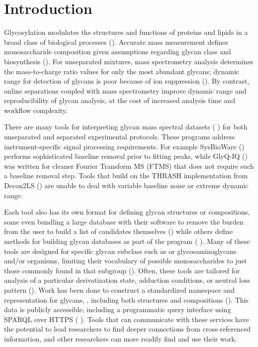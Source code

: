 \section{Introduction}

Glycosylation modulates the structures and functions of proteins and lipids
in a broad class of biological processes (\cite{Varki2017}). Accurate mass
measurement defines monosaccharide composition given assumptions regarding
glycan class and biosynthesis (\cite{Zaia2008}). For unseparated mixtures,
mass spectrometry analysis determines the mass-to-charge ratio values for
only the most abundant glycans; dynamic range for detection of glycans is
poor because of ion suppression (\cite{Peltoniemi2013}). By contrast, online
separations coupled with mass spectrometry improve dynamic range and
reproducibility of glycan analysis, at the cost of increased analysis time
and workflow complexity.

There are many tools for interpreting glycan mass spectral datasets (
\cite{Yu2013,Peltoniemi2013,Kronewitter2014,Goldberg2009,Maxwell2012,Ceroni2008,Frank2010})
for both unseparated and separated experimental protocols. These programs address
instrument-specific signal processing requirements. For example SysBioWare
(\cite{Frank2010}) performs sophisticated baseline removal prior to fitting
peaks, while GlyQ-IQ (\cite{Kronewitter2014}) was written for cleaner Fourier Transform
MS (FTMS) that does not require such a baseline removal step. Tools that build on
the THRASH implementation from Decon2LS (\cite{Jaitly2009,Yu2013,Maxwell2012})
are unable to deal with variable baseline noise or extreme dynamic range.

Each tool also has its own format for defining glycan structures or compositions,
some even bundling a large database with their software to remove the burden from
the user to build a list of candidates themselves (\cite{Yu2013,Kronewitter2014,Goldberg2009})
while others define methods for building glycan databases as part of the program (
\cite{Maxwell2012,Ceroni2008}). Many of these tools are designed for specific glycan
subclass such as \nglycans or glycosaminoglycans and/or organisms, limiting their
vocabulary of possible monosaccharides to just those commonly found in that subgroup
(\cite{Yu2013,Kronewitter2014,Peltoniemi2013,Goldberg2009}). Often, these tools are
tailored for analysis of a particular derivatization state, adduction conditions, or
neutral loss pattern (\cite{Yu2013,Peltoniemi2013,Maxwell2012}). Work has been done
to construct a standardized namespace and representation for glycans, \glyspace, including both
structures and compositions (\cite{Tiemeyer2017,Campbell2014}). This data is publicly
accessible, including a programmatic query interface using SPARQL over HTTPS (
\cite{Aoki-Kinoshita2015}). Tools that can communicate with these services have the
potential to lead researchers to find deeper connections from cross-referenced information,
and other researchers can more readily find and use their work.

